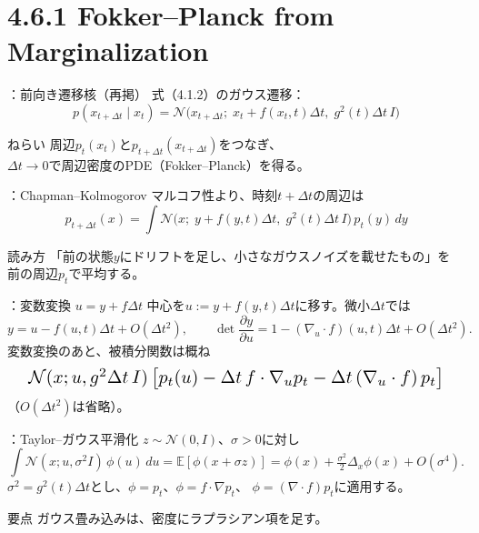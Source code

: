 \section{4.6.1 Fokker--Planck from Marginalization}
\assuppl
\begin{frame}{\supplmark：前向き遷移核（再掲）}
    式（4.1.2）のガウス遷移：
    \[
        p(x_{t+\Delta t}\mid x_t)
        =
        \mathcal{N}\!\bigl(
            x_{t+\Delta t};\;
            x_t + f(x_t,t)\Delta t,\;
            g^{2}(t)\Delta t\,I
        \bigr)
        \tag{4.1.2}
    \]
    \begin{exampleblock}{ねらい}
        周辺$p_t(x_t)$と$p_{t+\Delta t}(x_{t+\Delta t})$をつなぎ、\\
        $\Delta t\to 0$で周辺密度のPDE（Fokker--Planck）を得る。
    \end{exampleblock}
\end{frame}
\assuppl
\begin{frame}{\supplmark：Chapman--Kolmogorov}
    マルコフ性より、時刻$t+\Delta t$の周辺は
    \[
        p_{t+\Delta t}(x)
        =
        \int
        \mathcal{N}\!\bigl(
            x;\; y + f(y,t)\Delta t,\;
            g^{2}(t)\Delta t\,I
        \bigr)\,
        p_t(y)\,dy
    \]
    \begin{exampleblock}{読み方}
        「前の状態$y$にドリフトを足し、小さなガウスノイズを載せたもの」を\\
        前の周辺$p_t$で平均する。
    \end{exampleblock}
\end{frame}
\assuppl
\begin{frame}{\supplmark：変数変換 $u=y+f\Delta t$}
    中心を$u:=y+f(y,t)\Delta t$に移す。微小$\Delta t$では
    \[
        y = u - f(u,t)\Delta t + O(\Delta t^{2}),
        \qquad
        \det\frac{\partial y}{\partial u}
        = 1 - (\nabla_u\cdot f)(u,t)\Delta t + O(\Delta t^{2}).
    \]
    変数変換のあと、被積分関数は概ね
    \[
        \resizebox{0.95\textwidth}{!}{$
        \mathcal{N}(x;u,g^{2}\Delta t\,I)\,
        \bigl[
            p_t(u)
            - \Delta t\, f\cdot\nabla_u p_t
            - \Delta t\,(\nabla_u\cdot f)\,p_t
        \bigr]
        $}
    \]
    （$O(\Delta t^{2})$は省略）。
\end{frame}
\assuppl
\begin{frame}{\supplmark：Taylor--ガウス平滑化}
    $z\sim\mathcal{N}(0,I)$、$\sigma>0$に対し
    \[
        \int \mathcal{N}(x;u,\sigma^{2}I)\,\phi(u)\,du
        =
        \mathbb{E}[\phi(x+\sigma z)]
        =
        \phi(x) + \tfrac{\sigma^{2}}{2}\Delta_x\phi(x) + O(\sigma^{4}).
    \]
    $\sigma^{2}=g^{2}(t)\Delta t$とし、$\phi=p_t$、$\phi=f\cdot\nabla p_t$、
    $\phi=(\nabla\cdot f)p_t$に適用する。
    \begin{exampleblock}{要点}
        ガウス畳み込みは、密度にラプラシアン項を足す。
    \end{exampleblock}
\end{frame}
